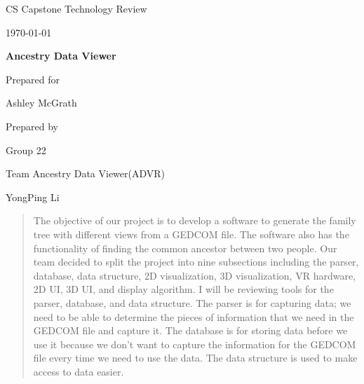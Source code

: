 \documentclass[onecolumn, draftclsnofoot, 10pt, compsoc]{IEEEtran}
\def \CapstoneTeamName{		Team Ancestry Data Viewer(ADVR)}
\def \CapstoneTeamNumber{		22}
\def \GroupMemberOne{			YongPing Li}
\def \GroupMemberTwo{			Monica Sek}
\def \GroupMemberThree{			Le-Chuan Chang}
\def \CapstoneProjectName{		Ancestry Data Viewer}
\def \CapstoneSponsorCompany{	}
\def \CapstoneSponsorPerson{		Ashley McGrath}
\def \DocType{	%
				Technology Review
				}
\newcommand{\NameSigPair}[1]{\par
\makebox[2.75in][r]{#1} \hfil 	\makebox[3.25in]{\makebox[2.25in]{\hrulefill} \hfill		\makebox[.75in]{\hrulefill}}
\par\vspace{-12pt} \textit{\tiny\noindent
\makebox[2.75in]{} \hfil		\makebox[3.25in]{\makebox[2.25in][r]{Signature} \hfill	\makebox[.75in][r]{Date}}}}
\renewcommand{\NameSigPair}[1]{#1}
\begin{document}
\begin{titlepage}
    \begin{singlespace}
        \hfill 
        \par\vspace{.2in}
        \centering
        \scshape{
            \huge CS Capstone \DocType \par
            {\large\today}\par
            \vspace{.5in}
            \textbf{\Huge\CapstoneProjectName}\par
            \vfill
            {\large Prepared for}\par
            \Huge \CapstoneSponsorCompany\par
            \vspace{5pt}
            {\Large\NameSigPair{\CapstoneSponsorPerson}\par}
            {\large Prepared by }\par
            Group\CapstoneTeamNumber\par
            \CapstoneTeamName\par 
            \vspace{5pt}
            {\Large
                \NameSigPair{\GroupMemberOne}\par
            }
            \vspace{20pt}
        }
        \begin{abstract}
		The objective of our project is to develop a software to generate the family tree with different views from a GEDCOM file. The software also has the functionality of finding the common ancestor between two people. Our team decided to split the project into nine subsections including the parser, database, data structure, 2D visualization, 3D visualization, VR hardware, 2D UI, 3D UI, and display algorithm. I will be reviewing tools for the parser, database, and data structure. The parser is for capturing data; we need to be able to determine the pieces of information that we need in the GEDCOM file and capture it. The database is for storing data before we use it because we don't want to capture the information for the GEDCOM file every time we need to use the data. The data structure is used to make access to data easier.
        \end{abstract}     
    \end{singlespace}
\end{titlepage}
\newpage
{}
\tableofcontents
\clearpage
\end{document}

